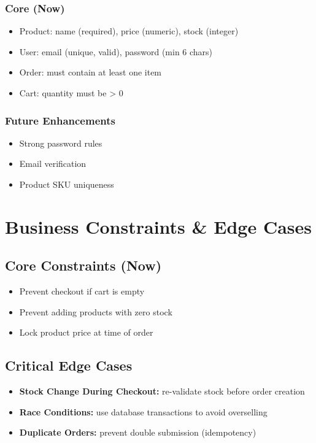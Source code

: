 \documentclass[12pt,a4paper]{article}
\begin{document}
\subsubsection{Core (Now)}
\begin{itemize}[noitemsep]
\item Product: name (required), price (numeric), stock (integer)
\item User: email (unique, valid), password (min 6 chars)
\item Order: must contain at least one item
\item Cart: quantity must be > 0
\end{itemize}

\subsubsection{Future Enhancements}
\begin{itemize}[noitemsep]
\item Strong password rules
\item Email verification
\item Product SKU uniqueness
\end{itemize}

\section{Business Constraints \& Edge Cases}

\subsection{Core Constraints (Now)}
\begin{itemize}[noitemsep]
\item Prevent checkout if cart is empty
\item Prevent adding products with zero stock
\item Lock product price at time of order
\end{itemize}

\subsection{Critical Edge Cases}
\begin{itemize}[noitemsep]
\item \textbf{Stock Change During Checkout:} re-validate stock before order creation
\item \textbf{Race Conditions:} use database transactions to avoid overselling
\item \textbf{Duplicate Orders:} prevent double submission (idempotency)
\end{itemize}
\end{document}
